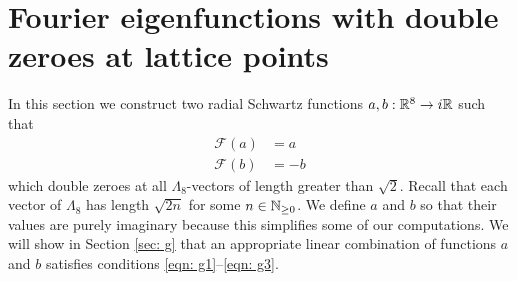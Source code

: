 \section{Fourier eigenfunctions with double zeroes at lattice points}\label{sec: fourier double zeroes}
In this section we construct two radial Schwartz functions $a,b:\mathbb{R}^8\to i\mathbb{R}$ such that
\begin{align}\mathcal{F}(a)&=a\label{eqn: a fourier}\\
  \mathcal{F}(b)&=-b\label{eqn: b fourier}
\end{align}
which double zeroes at all $\Lambda_8$-vectors of length greater than $\sqrt{2}$. Recall that each vector of $\Lambda_8$ has length $\sqrt{2n}$ for some $n\in\mathbb{N}_{\geq 0}$. We define $a$ and $b$ so that their values are purely imaginary because this simplifies some of our computations. We will show in Section \ref{sec: g} that an appropriate linear combination of functions $a$ and $b$ satisfies conditions \eqref{eqn: g1}--\eqref{eqn: g3}.

